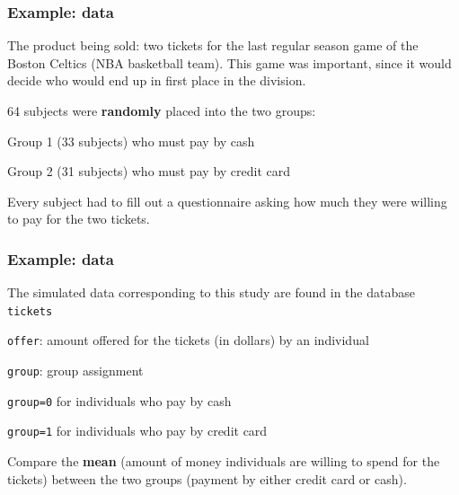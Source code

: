 \documentclass{beamer}
\begin{document}
\begin{frame}
\frametitle{Example:  data}
\bi
\item The product being sold: two tickets for the last regular season game of the Boston Celtics (NBA basketball team). 
This game was important, since it would decide who would end up in first place in the division.
\item 64 subjects were \textbf{randomly} placed into the two groups:
\bi

\item Group 1 (33 subjects) who must pay by cash
\item Group 2 (31 subjects) who must pay by credit card
\ei
\item Every subject had to fill out a questionnaire asking how much they were willing to pay for the two tickets. 
\ei

\end{frame}

\begin{frame}
\frametitle{Example:  data}
\bi
\item The simulated data corresponding to this study are found in the database \texttt{tickets} %
\item {\texttt{offer}}: amount offered for the tickets (in dollars) by an individual
\item {\texttt{group}}: group assignment
\bi
\item \texttt{group=0} for individuals who pay by cash
\item \texttt{group=1} for individuals who pay by credit card
\ei
\ei


\begin{tcolorbox}[colback=hecgrey!10!white,colframe=lightgray!75!black,title=General objective]
Compare the \alert{\textbf{mean}} (amount of money individuals are willing to spend for the tickets) between the two groups (payment by either credit card or cash).
\end{tcolorbox}
\end{frame}
\end{document}
